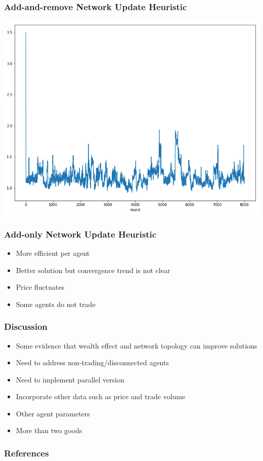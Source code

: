 \documentclass{beamer}
\begin{document}
\begin{frame}
  \frametitle{Add-and-remove Network Update Heuristic}
  \includegraphics[width=\textwidth]{h2allpriceave.png}
\end{frame}

\begin{frame}
  \frametitle{Add-only Network Update Heuristic}
  \begin{itemize}
  \item More efficient per agent
  \item Better solution but convergence trend is not clear
  \item Price fluctuates
  \item Some agents do not trade
  \end{itemize}
\end{frame}

\begin{frame}
  \frametitle{Discussion}
  \begin{itemize}
    \item Some evidence that wealth effect and network topology can improve
      solutions
    \item Need to address non-trading/disconnected agents
    \item Need to implement parallel version
    \item Incorporate other data such as price and trade volume
    \item Other agent parameters
    \item More than two goods
  \end{itemize}
\end{frame}

\begin{frame}
  \frametitle{References}
  
  
\end{frame}
\end{document}
